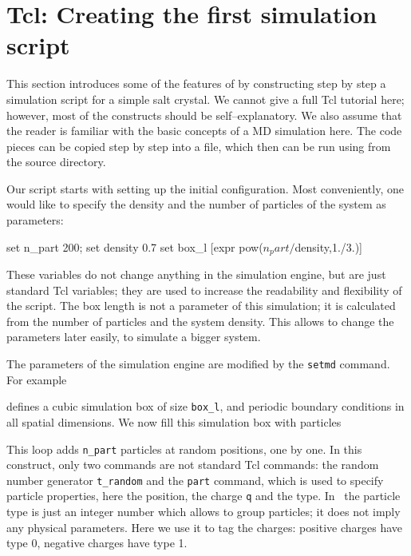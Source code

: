 
\section{Tcl: Creating the first simulation script}

This section introduces some of the features of \es by constructing
step by step a simulation script for a simple salt crystal.  We cannot
give a full Tcl tutorial here; however, most of the constructs should
be self--explanatory. We also assume that the reader is familiar with
the basic concepts of a MD simulation here. The code pieces can be
copied step by step into a file, which then can be run using
 from the \es source directory.

Our script starts with setting up the initial configuration.  Most
conveniently, one would like to specify the density and the number of
particles of the system as parameters:
\begin{tclcode}
set n_part 200; set density 0.7
set box_l [expr pow($n_part/$density,1./3.)]
\end{tclcode}
These variables do not change anything in the simulation engine, but
are just standard Tcl variables; they are used to increase the
readability and flexibility of the script. The box length is not a
parameter of this simulation; it is calculated from the number of
particles and the system density. This allows to change the parameters
later easily, \eg to simulate a bigger system.

The parameters of the simulation engine are modified by the
\verb|setmd| command. For example
defines a cubic simulation box of size \verb|box_l|, and periodic
boundary conditions in all spatial dimensions. We now fill this
simulation box with particles
This loop adds \verb|n_part| particles at random positions, one by
one.  In this construct, only two commands are not standard Tcl
commands: the random number generator \verb|t_random| and the
\verb|part| command, which is used to specify particle properties,
here the position, the charge \verb|q| and the type. In \es\ the
particle type is just an integer number which allows to group
particles; it does not imply any physical parameters. Here we use it
to tag the charges: positive charges have type 0, negative charges
have type 1.

